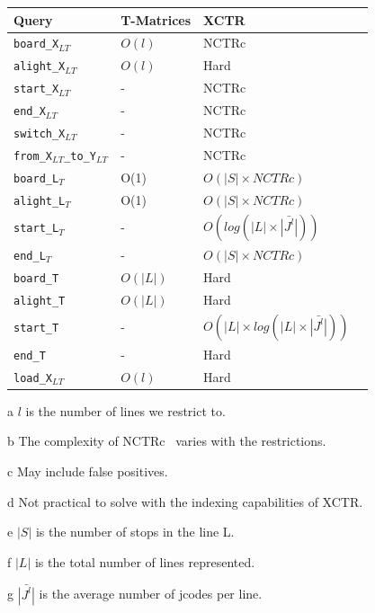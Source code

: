 \documentclass[runningheads]{llncs}
\newcommand{\acumm}{T-Matrices} %
\newcommand{\ctr}{XCTR}
\newcommand{\ctrq}{NCTRc}
\begin{document}
\begin{threeparttable}
\centering
\caption{Efficiency of \acumm~and \ctr~against the queries described in Section~\ref{sec:rq}}
\label{tab:queries}
\begin{tabular}{|l|l|l|}
\hline
Query &  \acumm & \ctr\\
\hline
\texttt{board\_X$_{LT}$} & $O(l)$\tnote{a} & \ctrq\tnote{b} \\
\texttt{alight\_X$_{LT}$} & $O(l)$\tnote{a} & Hard\tnote{cd} \\
\texttt{start\_X$_{LT}$} & - & \ctrq\tnote{b} \\
\texttt{end\_X$_{LT}$} & - & \ctrq\tnote{b} \\
\texttt{switch\_X$_{LT}$} & - & \ctrq\tnote{b} \\
\texttt{from\_X$_{LT}$\_to\_Y$_{LT}$} & - & \ctrq\tnote{b} \\
\texttt{board\_L$_T$} & O(1) & $O(|S| \times \ctrq)$\tnote{be} \\
\texttt{alight\_L$_T$} & O(1) & $O(|S| \times \ctrq)$\tnote{bce} \\
\texttt{start\_L$_T$} & - & $O(log(|L|\times\bar{|J^l|}))$\tnote{fg} \\
\texttt{end\_L$_T$} & - & $O(|S| \times \ctrq)$\tnote{be} \\
\texttt{board\_T} & $O(|L|)$\tnote{f} & Hard\tnote{d} \\
\texttt{alight\_T} & $O(|L|)$\tnote{f} & Hard\tnote{cd} \\
\texttt{start\_T} & - & $O(|L| \times log(|L|\times\bar{|J^l|}))$\tnote{fg}~~ \\
\texttt{end\_T} & - & Hard\tnote{d} \\
\texttt{load\_X$_{LT}$} & $O(l)$\tnote{a} & Hard\tnote{cd} \\
\hline
\end{tabular}

\begin{tablenotes}
\item[a] $l$ is the number of lines we restrict to.
\item[b] The complexity of \ctrq~ varies with the restrictions.
\item[c] May include false positives.
\item[d] Not practical to solve with the indexing capabilities of \ctr.
\item[e] $|S|$ is the number of stops in the line L.
\item[f] $|L|$ is the total number of lines represented.
\item[g] $\bar{|J^l|}$ is the average number of jcodes per line.
\end{tablenotes}
\end{threeparttable}
\end{document}
